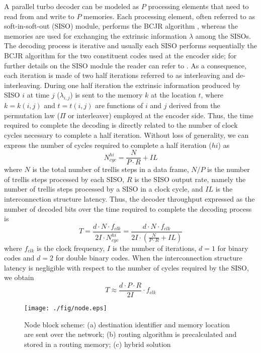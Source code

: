 \documentclass[10pt,twocolumn,journal]{IEEEtran}
\begin{document}
A parallel turbo decoder can be modeled as $P$ processing elements that need to read from and write to $P$ memories. 
Each processing element, often referred to as soft-in-soft-out (SISO) module, performs the BCJR 
algorithm \cite{bahl_TrIT94}, whereas the memories are used for exchanging the extrinsic information $\lambda$ among 
the SISOs. The decoding process is iterative and usually each SISO performs sequentially the BCJR algorithm for the two constituent 
codes used at the encoder side; for further details on the SISO module the reader can refer to \cite{benedetto_ETR98}.
As a consequence, each iteration is made of two half iterations referred to as 
interleaving and de-interleaving. During one half iteration the extrinsic information produced by SISO $i$ at time  
$j$ ($\lambda_{i,j}$) 
is sent to the memory $k$ at the location $t$, where $k=k(i,j)$ and $t=t(i,j)$ are functions of $i$ and $j$
derived from 
the permutation law ($\Pi$ or interleaver) employed at the encoder side. 
Thus, the time required to complete the decoding is directly related to the number of clock cycles necessary to 
complete a half iteration. 
Without loss of generality, we can express the number of cycles required to complete a 
half iteration ($hi$) as 
\begin{equation}
N^{hi}_{cyc} = \frac{N}{P \cdot R} + IL
\end{equation}
where $N$ is the total number of trellis steps in a data frame, $N/P$ is 
the number of trellis steps processed by each SISO, $R$ is the SISO output rate, namely the number of trellis steps processed by 
a SISO in a clock cycle, and $IL$ is the 
interconnection structure latency.
Thus, the decoder throughput expressed as the number of decoded bits over the time required to complete the decoding 
process is
\begin{equation}
T = \frac{d\cdot N \cdot f_{clk}}{2I \cdot N^{hi}_{cyc}} = \frac{d\cdot N\cdot f_{clk}}{2I\cdot\left(\frac{N}{P\cdot R} + IL \right)}
\label{eq:T}
\end{equation}
where $f_{clk}$ is the clock frequency, $I$ is the number of iterations, $d=1$ for binary codes and $d=2$ for double 
binary codes. When the interconnection structure latency is negligible with respect to the number of cycles required 
by the SISO, we obtain
\begin{equation}
T \approx \frac{d \cdot P \cdot R}{2I} \cdot f_{clk}
\label{eq:Tapprox}
\end{equation}
\begin{figure*}[th!]
  \centering
  \texttt{[image: ./fig/node.eps]}
\caption{Node block scheme: 
(a) destination identifier and memory location are sent over the network;
(b) routing algorithm is precalculated and stored in a routing memory;
(c) hybrid solution}
\label{fig:node}
\end{figure*}
\end{document}
